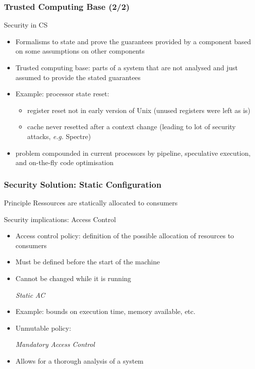 \begin{reveals}
\begin{frame}
  \frametitle{Trusted Computing Base (2/2)}

  \begin{block}{Security in CS}
    \begin{itemize}
    \item Formalisms to state and prove the guarantees provided by a
      component based on some assumptions on other components
    \item Trusted computing base: parts of a system that are not
      analysed and just assumed to provide the stated guarantees
    \item Example: processor state reset:
      \begin{itemize}
      \item register reset not in early version of Unix (unused registers were left as is)
      \item cache never resetted after a context change (leading to
        lot of security attacks, \textit{e.g.} Spectre)
      \end{itemize}
    \item problem compounded in current processors by pipeline,
      speculative execution, and on-the-fly code optimisation
    \end{itemize}
  \end{block}
\end{frame}


\begin{frame}
  \frametitle{Security Solution: Static Configuration}
  
  \begin{block}{Principle}
    Ressources are statically allocated to consumers
  \end{block}

  \begin{block} {Security implications: Access Control}
    \begin{itemize}[<+->]
    \item Access control policy: definition of the possible allocation
      of resources to consumers
    \item Must be defined before the start of the machine
    \item Cannot be changed while it is running
      \begin{center}
        \emph{Static AC}
      \end{center}
    \item Example: bounds on execution time, memory available, etc.
    \item Unmutable policy:
      \begin{center}
        \emph{Mandatory Access Control}
      \end{center}
    \item Allows for a thorough analysis of a system
    \end{itemize}
  \end{block}


\end{frame}
\end{reveals}
